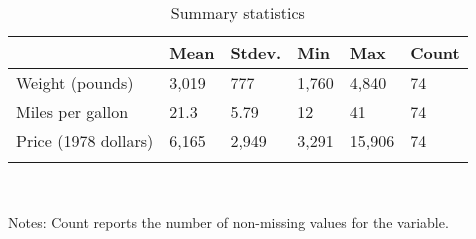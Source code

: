 \documentclass{article}
\begin{document}
\begin{table}[tbp] \centering
{}

\caption{Summary statistics}
\label{tab:my_summary_stats}
\begin{tabularx}{\linewidth}{@{}lCCCCC@{}}

\toprule
{}&{Mean}&{Stdev.}&{Min}&{Max}&{Count} \tabularnewline
\midrule \addlinespace[\belowrulesep]
Weight (pounds)&3,019&777&1,760&4,840&74 \tabularnewline
Miles per gallon&21.3&5.79&12&41&74 \tabularnewline
Price (1978 dollars)&6,165&2,949&3,291&15,906&74 \tabularnewline
\bottomrule \addlinespace[\belowrulesep]

\end{tabularx}
\\ \parbox{\linewidth}{\footnotesize Notes: Count reports the number of non-missing values for the variable.}
\end{table}
\end{document}
